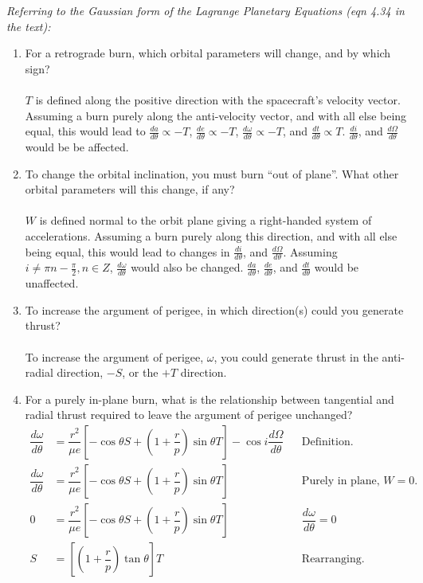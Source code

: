 \documentclass[onecolumn,10pt]{jhwhw}
\begin{document}
\clearpage
\problem{}
\textit{Referring to the Gaussian form of the Lagrange Planetary Equations (eqn 4.34 in the text):}
\begin{enumerate}
\item For a retrograde burn, which orbital parameters will change, and by which sign? \\
\\
$T$ is defined along the positive direction with the spacecraft's velocity vector. Assuming a burn purely along the anti-velocity vector, and with all else being equal, this would lead to $\frac{da}{d \theta} \propto -T$, $\frac{de}{d \theta} \propto -T$, $\frac{d \omega}{d \theta} \propto -T$, and $\frac{dt}{d \theta} \propto T$. $\frac{di}{d \theta}$, and $\frac{d \Omega}{d \theta}$ would be be affected.
\item To change the orbital inclination, you must burn ``out of plane''. What other orbital parameters will this change, if any? \\
\\
$W$ is defined normal to the orbit plane giving a right-handed system of accelerations. Assuming a burn purely along this direction, and with all else being equal, this would lead to changes in $\frac{di}{d \theta}$, and $\frac{d \Omega}{d \theta}$. Assuming $i \neq \pi n - \frac{\pi}{2}, n \in Z$, $\frac{d \omega}{d \theta}$ would also be changed. $\frac{da}{d \theta}$, $\frac{de}{d \theta}$, and $\frac{dt}{d \theta}$ would be unaffected.
\item To increase the argument of perigee, in which direction(s) could you generate thrust? \\
\\
To increase the argument of perigee, $\omega$, you could generate thrust in the anti-radial direction, $-S$, or the $+T$ direction.
\item For a purely in-plane burn, what is the relationship between tangential and radial thrust required to leave the argument of perigee unchanged?
\begin{align*}
\dfrac{d \omega}{d \theta} &= \dfrac{r^2}{\mu e} \left[ -\cos{\theta S} + \left( 1 + \dfrac{r}{p} \right) \sin{\theta T} \right] - \cos{i} \dfrac{d \Omega}{d \theta} & & \mbox{Definition.} \\
\dfrac{d \omega}{d \theta} &= \dfrac{r^2}{\mu e} \left[ -\cos{\theta S} + \left( 1 + \dfrac{r}{p} \right) \sin{\theta T} \right]                                      & & \mbox{Purely in plane, $W=0$.} \\
                         0 &= \dfrac{r^2}{\mu e} \left[ -\cos{\theta S} + \left( 1 + \dfrac{r}{p} \right) \sin{\theta T} \right]                                      & & \dfrac{d \omega}{d \theta} = 0 \\
                        S  &=                    \left[                   \left( 1 + \dfrac{r}{p} \right) \tan{\theta}   \right] T                                    & & \mbox{Rearranging.} \\
\end{align*}
\end{enumerate}
\end{document}
